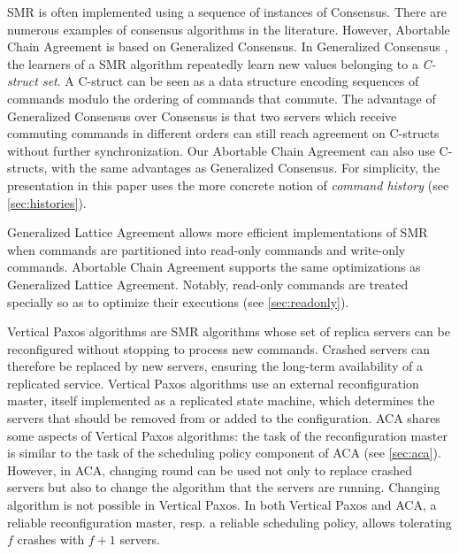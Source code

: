 SMR is often implemented using a sequence of instances of Consensus.
There are numerous examples of consensus algorithms in the literature.
However, Abortable Chain Agreement is based on Generalized Consensus. 
In Generalized Consensus \cite{Lamport05GeneralizeConsensus}, the learners of a
SMR algorithm repeatedly learn new values belonging to a \emph{C-struct set}. A
C-struct can be seen as a data structure encoding  sequences of commands modulo
the ordering of commands that commute. The advantage of Generalized
Consensus over Consensus is that
two servers which receive commuting commands in different orders can still reach
agreement on C-structs without further synchronization. 
Our Abortable Chain Agreement can also use C-structs, with the same advantages
as Generalized Consensus. For simplicity, the presentation in this
paper uses the more concrete notion of \emph{command history} (see
\cref{sec:histories}).

Generalized Lattice Agreement \cite{FalerioETAL12GeneralizedLatticeAgreement} allows more efficient implementations of SMR when
commands are partitioned into read-only commands and write-only commands.
Abortable Chain Agreement supports the same optimizations as Generalized Lattice Agreement.
Notably, read-only commands are treated specially so as to optimize their
executions (see \cref{sec:readonly}).

Vertical Paxos algorithms 
\cite{LamportMalkhiZhou09VerticalPaxosPrimarybackupReplication} are SMR algorithms
whose set of replica servers can be reconfigured without stopping to process new
commands. Crashed servers can therefore be replaced by new servers, ensuring the
long-term availability of a replicated service.
Vertical Paxos algorithms use an external reconfiguration master, itself
implemented as a replicated state machine, which determines the servers that should
be removed from or added to the configuration.
ACA shares some aspects of Vertical Paxos algorithms: the task of the
reconfiguration master is similar to the task of the scheduling policy
component of ACA (see \cref{sec:aca}).
However, in ACA, changing round can be used not only to replace crashed servers
but also to change the algorithm that the servers are running. 
Changing algorithm is not possible in Vertical Paxos.
In both Vertical Paxos and ACA, a reliable reconfiguration master, resp. a
reliable scheduling policy, allows tolerating $f$ crashes with $f+1$ servers.

